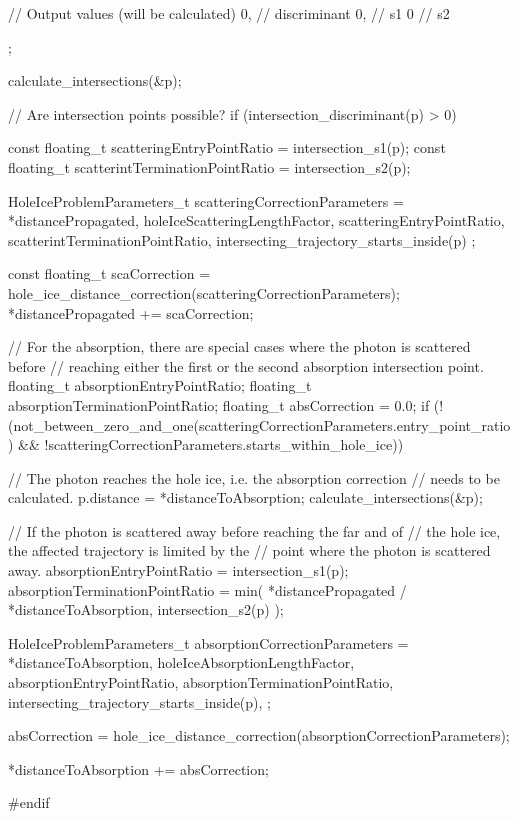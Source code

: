 \begin{ccode}
{{{{{          // Output values (will be calculated)
          0, // discriminant
          0, // s1
          0  // s2

        };

        calculate_intersections(&p);

        // Are intersection points possible?
        if (intersection_discriminant(p) > 0) {

          const floating_t scatteringEntryPointRatio = intersection_s1(p);
          const floating_t scatterintTerminationPointRatio = intersection_s2(p);

          HoleIceProblemParameters_t scatteringCorrectionParameters = {
            *distancePropagated,
            holeIceScatteringLengthFactor,
            scatteringEntryPointRatio,
            scatterintTerminationPointRatio,
            intersecting_trajectory_starts_inside(p)
          };

          const floating_t scaCorrection = hole_ice_distance_correction(scatteringCorrectionParameters);
          *distancePropagated += scaCorrection;

          // For the absorption, there are special cases where the photon is scattered before
          // reaching either the first or the second absorption intersection point.
          floating_t absorptionEntryPointRatio;
          floating_t absorptionTerminationPointRatio;
          floating_t absCorrection = 0.0;
          if (!(not_between_zero_and_one(scatteringCorrectionParameters.entry_point_ratio) && !scatteringCorrectionParameters.starts_within_hole_ice)) {
            // The photon reaches the hole ice, i.e. the absorption correction
            // needs to be calculated.
            p.distance = *distanceToAbsorption;
            calculate_intersections(&p);

            // If the photon is scattered away before reaching the far and of
            // the hole ice, the affected trajectory is limited by the
            // point where the photon is scattered away.
            absorptionEntryPointRatio = intersection_s1(p);
            absorptionTerminationPointRatio = min(
              *distancePropagated / *distanceToAbsorption,
              intersection_s2(p)
            );

            HoleIceProblemParameters_t absorptionCorrectionParameters = {
              *distanceToAbsorption,
              holeIceAbsorptionLengthFactor,
              absorptionEntryPointRatio,
              absorptionTerminationPointRatio,
              intersecting_trajectory_starts_inside(p),
            };

            absCorrection = hole_ice_distance_correction(absorptionCorrectionParameters);

          }
          *distanceToAbsorption += absCorrection;

        }

      }
    }
  }

}

#endif
\end{ccode}

